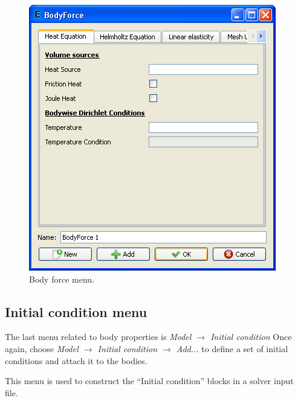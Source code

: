 \documentclass[a4paper,12pt]{article}
\newcommand{\menu}[2]{{\it \vskip2mm #1 $\rightarrow$ #2 \vskip2mm}}
\newcommand{\dynmenu}[3]{{\it \vskip2mm #1 $\rightarrow$ #2 $\rightarrow$ #3 \vskip2mm}}
\begin{document}
\begin{figure}[ht]
\begin{center}
 \includegraphics[scale=0.5]{images/bodyforce.png}
\caption{Body force menu.}
\end{center}
\end{figure}

\subsection{Initial condition menu}

The last menu related to body properties is
\menu{Model}{Initial condition}
\noindent 
Once again, choose
\dynmenu{Model}{Initial condition}{Add...}
\noindent to define a set of initial conditions and attach it to the bodies.

This menu is used to construct the ``Initial condition'' blocks in a
solver input file.
\end{document}
